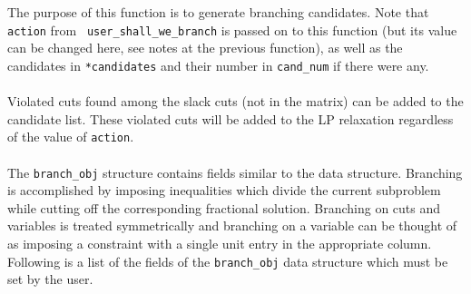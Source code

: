 \bd

\describe

The purpose of this function is to generate branching candidates. Note
that {\tt *action} from {\tt {}
{user_shall_we_branch}} is passed on to
this function (but its value can be changed here, see notes at the
previous function), as well as the candidates in {\tt **candidates}
and their number in {\tt *cand\_num} if there were any. \\
\\
Violated cuts found among the slack cuts (not in the matrix) can be
added to the candidate list. These violated cuts will be added to the
LP relaxation regardless of the value of {\tt *action}. \\
\\
The {\tt branch\_obj} structure contains fields similar to the
{\tt {}} data structure. Branching is
accomplished by imposing inequalities which divide the current
subproblem while cutting off the corresponding fractional solution.
Branching on cuts and variables is treated symmetrically and branching
on a variable can be thought of as imposing a constraint with a single
unit entry in the appropriate column. Following is a list of the
fields of the {\tt branch\_obj} data structure which must be set by
the user.

